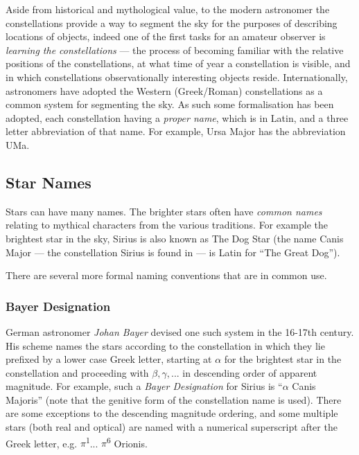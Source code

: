 Aside from historical and mythological value, to the modern astronomer
the constellations provide a way to segment the sky for the purposes of
describing locations of objects, indeed one of the first tasks for an
amateur observer is \emph{learning the constellations} --- the process
of becoming familiar with the relative positions of the constellations,
at what time of year a constellation is visible, and in which
constellations observationally interesting objects reside.
Internationally, astronomers have adopted the Western (Greek/Roman)
constellations as a common system for segmenting the sky. As such some
formalisation has been adopted, each constellation having a \emph{proper
name}, which is in Latin, and a three letter abbreviation of that name.
For example, Ursa Major has the abbreviation UMa.

\subsection{Star Names}\label{star-names}

Stars can have many names. The brighter stars often have \emph{common
names} relating to mythical characters from the various traditions. For
example the brightest star in the sky, Sirius is also known as The Dog
Star (the name Canis Major --- the constellation Sirius is found in ---
is Latin for ``The Great Dog'').

There are several more formal naming conventions that are in common use.

\subsubsection{Bayer Designation}\label{bayer-designation}

German astronomer \emph{Johan Bayer} devised one such system in the
16-17th century. His scheme names the stars according to the
constellation in which they lie prefixed by a lower case Greek letter,
starting at $\alpha$ for the brightest star in the constellation and proceeding with $\beta, \gamma, ...$ in descending order of apparent magnitude. For example,
such a \emph{Bayer Designation} for Sirius is ``$\alpha$ Canis Majoris'' (note
that the genitive form of the constellation name is used). There are
some exceptions to the descending magnitude ordering, and some multiple
stars (both real and optical) are named with a numerical superscript
after the Greek letter, e.g. $\pi$\textsuperscript{1}...
$\pi$\textsuperscript{6} Orionis.

